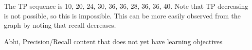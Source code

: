 \begin{parts}
\begin{subparts}
\begin{minipage}{0.4\textwidth}
\end{minipage}

    \begin{tcolorbox}[fit,height=3cm, width=15cm, blank, borderline={1pt}{-2pt}]
    \end{tcolorbox}
    \begin{soln}
    The TP sequence is 10, 20, 24, 30, 36, 36, 28, 36, 36, 40. Note that TP decreasing is not possible, so this is impossible. This can be more easily observed from the graph by noting that recall decreases.
    \end{soln}


\end{subparts}

    \begin{qauthor}
    Abhi, Precision/Recall content that does not yet have learning objectives
    \end{qauthor}





 
\end{parts}
